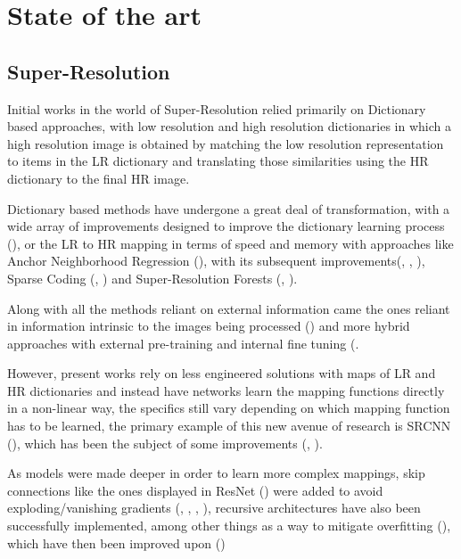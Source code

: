 \chapter{State of the art} %

\label{Chapter2}

\section{Super-Resolution}

Initial works in the world of Super-Resolution relied primarily on Dictionary based approaches, with low resolution and high resolution dictionaries in which a high resolution image is obtained by matching the low resolution representation to items in the LR dictionary and translating those similarities using the HR dictionary to the final HR image.

\hfill 

Dictionary based methods have undergone a great deal of transformation, with a wide array of improvements designed to improve the dictionary learning process (\cite{BPJDL}), or the LR to HR mapping in terms of speed and memory with approaches like Anchor Neighborhood Regression (\cite{ANR}), with its subsequent improvements(\cite{APlus}, \cite{IA}, \cite{PSyCo}), Sparse Coding (\cite{SC}, \cite{CSCN}) and Super-Resolution Forests (\cite{NBSRF}, \cite{RFL}).

\hfill

Along with all the methods reliant on external information came the ones reliant in information intrinsic to the images being processed (\cite{SelfEx}) and more hybrid approaches with external pre-training and internal fine tuning (\cite{DJSR}.

\hfill

However, present works rely on less engineered solutions with maps of LR and HR dictionaries and instead have networks learn the mapping functions directly in a non-linear way, the specifics still vary depending on which mapping function has to be learned, the primary example of this new avenue of research is SRCNN (\cite{SRCNN}), which has been the subject of some improvements (\cite{ESPCN}, \cite{FSRCNN}).

\hfill

As models were made deeper in order to learn more complex mappings, skip connections like the ones displayed in ResNet (\cite{ResNet}) were added to avoid exploding/vanishing gradients (\cite{DRRN}, \cite{VDSR}, \cite{SRGAN}, \cite{EDSR}), recursive architectures have also been successfully implemented, among other things as a way to mitigate overfitting (\cite{DRCN}), which have then been improved upon (\cite{DRRN}) 

